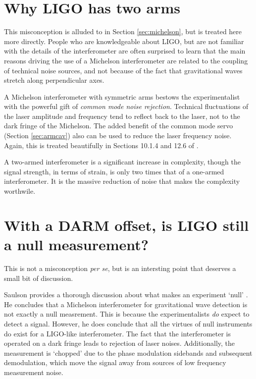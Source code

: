 \section{Why LIGO has two arms}
This misconception is alluded to in Section \ref{sec:michelson}, but is treated here more directly. %
People who are knowledgeable about LIGO, but are not familiar with the details of the interferometer are often surprised to learn that the main reasons driving the use of a Michelson interferometer are related to the coupling of technical noise sources, and not because of the fact that gravitational waves stretch along perpendicular axes.

A Michelson interferometer with symmetric arms bestows the experimentalist with the powerful gift of \emph{common mode noise rejection}. %
Technical fluctuations of the laser amplitude and frequency tend to reflect back to the laser, not to the dark fringe of the Michelson. %
The added benefit of the common mode servo (Section \ref{sec:armcav}) also can be used to reduce the laser frequency noise. %
Again, this is treated beautifully in Sections 10.1.4 and 12.6 of \citet{saulson1994fundamentals}. %


A two-armed interferometer is a significant increase in complexity, though the signal strength, in terms of strain, is only two times that of a one-armed interferometer. %
It is the massive reduction of noise that makes the complexity worthwile.

\section{With a DARM offset, is LIGO still a null measurement?}
This is not a misconception {\it per se}, but is an intersting point that deserves a small bit of discussion.

Saulson provides a thorough discussion about what makes an experiment `null' \cite[Chapter 10]{saulson1994fundamentals}. %
He concludes that a Michelson interferometer for gravitational wave detection is not exactly a null measrement. %
This is because the experimentalists \emph{do} expect to detect a signal. %
However, he does conclude that all the virtues of null instruments do exist for a LIGO-like interferometer. %
The fact that the interferometer is operated on a dark fringe leads to rejection of laser noises. %
Additionally, the measurement is `chopped' due to the phase modulation sidebands and subsequent demodulation, which move the signal away from sources of low frequency measurement noise.

